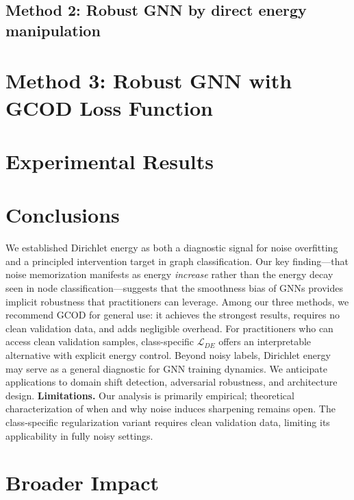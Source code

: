 \documentclass{article}
\newcommand{\method}{GCOD }
\theoremstyle{plain}
\theoremstyle{definition}
\theoremstyle{remark}
\begin{document}
\subsection{Method 2: Robust GNN by direct energy manipulation}
\label{sec:regularization}



\section{Method 3: Robust GNN with GCOD Loss Function}
\label{sec:GNNrobustnessLoss}

\section{Experimental Results}


\section{Conclusions}

We established Dirichlet energy as both a diagnostic signal for noise overfitting and a principled intervention target in graph classification. 
% 
Our key finding—that noise memorization manifests as energy \emph{increase} rather than the energy decay seen in node classification—suggests that the smoothness bias of GNNs provides implicit robustness that practitioners can leverage.
% 
Among our three methods, we recommend \method for general use: it achieves the strongest results, requires no clean validation data, and adds negligible overhead.
% 
For practitioners who can access clean validation samples, class-specific $\mathcal{L}_{DE}$  offers an interpretable alternative with explicit energy control.
% 
Beyond noisy labels, Dirichlet energy may serve as a general diagnostic for GNN training dynamics. 
We anticipate applications to domain shift detection, adversarial robustness, and architecture design.
\textbf{Limitations.} Our analysis is primarily empirical; theoretical characterization of when and why noise induces sharpening remains open. 
% 
The class-specific regularization variant requires clean validation data, limiting its applicability in fully noisy settings.
% 
% 

\section*{Broader Impact}
\end{document}
